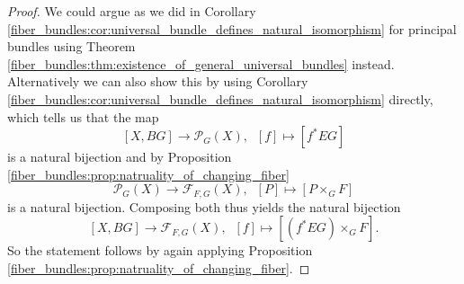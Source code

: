\begin{proof}
    We could argue as we did in Corollary \ref{fiber_bundles:cor:universal_bundle_defines_natural_isomorphism} for principal bundles using Theorem \ref{fiber_bundles:thm:existence_of_general_universal_bundles} instead. Alternatively we can also show this by using Corollary \ref{fiber_bundles:cor:universal_bundle_defines_natural_isomorphism} directly, which tells us that the map 
    \[
    [X,BG] \to \mathcal{P}_G(X), \; \; [f] \mapsto [f^\ast EG]
    \]
    is a natural bijection and by Proposition \ref{fiber_bundles:prop:natruality_of_changing_fiber}
    \[
    \mathcal{P}_G(X) \to \mathcal{F}_{F,G}(X), \; \; [P] \mapsto \left[P \times_G F\right]
    \]
    is a natural bijection. Composing both thus yields the natural bijection 
    \[
    [X,BG] \to \mathcal{F}_{F,G}(X), \; \; [f] \mapsto \left[(f^\ast EG) \times_G F\right].
    \]
    So the statement follows by again applying Proposition \ref{fiber_bundles:prop:natruality_of_changing_fiber}.
\end{proof}
